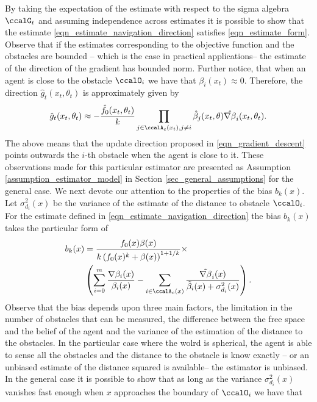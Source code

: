 \documentclass[article]{IEEEtran}
\theoremstyle{definition}
\begin{document}
%
By taking the expectation of the estimate with respect to the sigma algebra $\ccalG_t$ and assuming independence across estimates it is possible to show that the estimate \eqref{eqn_estimate_navigation_direction} satisfies \eqref{eqn_estimate_form}. Observe that if the estimates corresponding to the objective function and the obstacles are bounded -- which is the case in practical applications-- the estimate of the direction of the gradient has bounded norm. Further notice, that when an agent is close to the obstacle $\ccalO_i$  we have that $\beta_i(x_t) \approx 0$. Therefore, the direction $\hat{g}_t(x_t,\theta_t)$ is approximately given by
\begin{equation}
\hat{g}_t(x_t,\theta_t) \approx -\frac{\hat{f}_0(x_t,\theta_t) }{k} \prod_{j\in\ccalA_c(x_t), j\neq i} \hat{\beta}_j(x_t,\theta) \hat{\nabla \beta}_i(x_t,\theta_t).
\end{equation}
%
The above means that the update direction proposed in \eqref{eqn_gradient_descent} points outwards the $i$-th obstacle when the agent is close to it. These observations made for this particular estimator are presented as Assumption \ref{assumption_estimator_model} in Section \ref{sec_general_assumptions} for the general case. We next devote our attention to the properties of the bias $b_k(x)$. Let $\sigma_{d_i}^2(x)$ be the variance of the estimate of the distance to obstacle $\ccalO_i$. For the estimate defined in \eqref{eqn_estimate_navigation_direction} the bias $b_k(x)$ takes the particular form of 
%
\begin{equation}
\begin{split}
b_k(x) &= \frac{f_0(x)\beta(x)}{k\left(f_0(x)^k+\beta(x)\right)^{1+1/k}}\times\\
&\left(\sum_{i=0}^m\frac{\nabla \beta_i(x)}{\beta_i(x)}-\sum_{i\in\ccalA_c(x)}\frac{\tilde{\nabla \beta}_i(x)}{\tilde{\beta}_i(x)+\sigma_{d_i}^2(x)}\right).
\end{split}
\end{equation}
%
Observe that the bias depends upon three main factors, the limitation in the number of obstacles that can be measured, the difference between the free space and the belief of the agent and the variance of the estimation of the distance to the obstacles. In the particular case where the wolrd is spherical, the agent is able to sense all the obstacles and the distance to the obstacle is know exactly -- or an unbiased estimate of the distance squared is available-- the estimator is unbiased. In the general case it is possible to show that as long as the variance $\sigma_{d_i}^2(x)$ vanishes fast enough when $x$ approaches the boundary of $\ccalO_i$ we have that 
\end{document}

